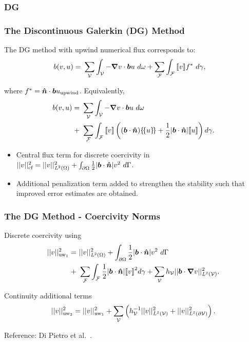 \subsubsection{DG}

\begin{frame}
\frametitle{The Discontinuous Galerkin (DG) Method}

The DG method with upwind numerical flux corresponds to:
\begin{align}
b(v,u)
=\ & \sum_{\fe{V}} \int_{\fe{V}} - \nabla v \cdot \varv{b} u\ d\omega
+ \sum_{\fe{F}} \int_{\fe{F}} \jump{v} f^*\ d\gamma,
\end{align}

where $f^* = \mathit{\bm{{\hat{n}}}} \cdot \mathit{\bm{{b}}} u_\text{upwind}$. Equivalently,
\begin{align}
b(v,u)
=\ & \sum_{\fe{V}} \int_{\fe{V}} - \nabla v \cdot \varv{b} u\ d\omega \\
  +\ & \sum_{\fe{F}} \int_{\fe{F}} \jump{v}
       \left(
       (\varv{b} \cdot \varv{\hat{n}}) \avg{u} +
       \frac{1}{2} |\varv{b} \cdot \varv{\hat{n}}| \jump{u}
       \right) d\gamma.
\end{align}

\begin{itemize}
  \item Central flux term for discrete coercivity in $||v||^2_\text{cf} =
    ||v||^2_{\mathit{{{L}}}^2(\Omega)} + \int_{\partial \Omega} \frac{1}{2}
    |\mathit{\bm{{b}}} \cdot \mathit{\bm{{\hat{n}}}}| v^2\ d\Gamma$.
  \item Additional penalization term added to strengthen the stability such that
    improved error estimates are obtained.
\end{itemize}

\end{frame}

\begin{frame}
\frametitle{The DG Method - Coercivity Norms}

Discrete coercivity using
\begin{align}
  ||v||^2_\text{uw$_1$}
  =\ &
  ||v||^2_{\fspace{L}^2(\Omega)}
  +
  \int_{\partial \Omega} \frac{1}{2} |\varv{b} \cdot \varv{\hat{n}}| v^2\ d\Gamma \\
  +\ &
  \sum_{\fe{F}} \int_{\fe{F}} \frac{1}{2} |\varv{b} \cdot \varv{\hat{n}}| \jump{v}^2 d\gamma
  +
  \sum_{\fe{V}} h_\fe{V} || \varv{b} \cdot \nabla v ||^2_{\fspace{L^2(\fe{V})}}.
\end{align}

Continuity additional terms
\begin{align}
  ||v||^2_\text{uw$_2$}
  =
  ||v||^2_\text{uw$_1$}
  +
  \sum_{\mathcal{{{V}}}} \left( h_{\mathcal{{{V}}}}^{-1} || v ||^2_{\mathit{{{L^2(\mathcal{{{V}}})}}}} + || v ||^2_{\mathit{{{L^2(\partial \mathcal{{{V}}})}}}} \right).
\end{align}

Reference: Di Pietro et al.~\cite{DiPietro2011}.

\end{frame}
